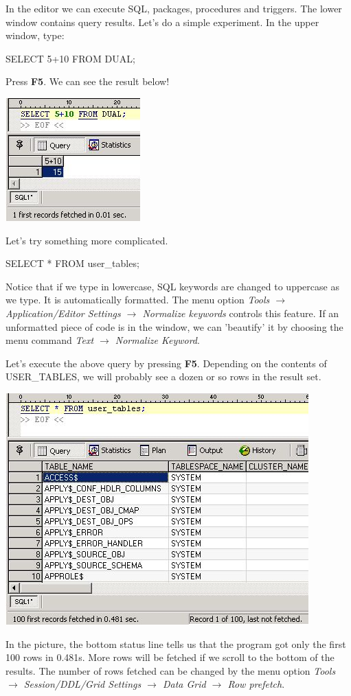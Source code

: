\documentclass[a4paper,titlepage]{article}
\begin{document}
In the editor we can execute SQL, packages, procedures and triggers.
The lower window contains query results. Let's do a simple experiment. In the upper window, type:
\begin{center}
SELECT 5+10 FROM DUAL;\\
\end{center}
Press \textbf{F5}. We can see  the result below!\\
\begin{center}
\includegraphics[bb=0 0 196 179,scale=.7]{01main01}
\end{center}

Let's try something more complicated.
\begin{center}
SELECT * FROM user\_tables;
\end{center}

Notice that if we type in lowercase, SQL keywords are changed to uppercase as we type. 
It is automatically formatted. The menu option \emph{Tools $\to$ Application/Editor Settings $\to$ 
Normalize keywords} controls this feature.  If an unformatted piece of code is in the window, 
we can 'beautify' it by choosing the 
menu command \emph{Text $\to$ Normalize Keyword}.

Let's execute the above query by pressing \textbf{F5}. Depending on the contents of USER\_TABLES, we will probably see a 
dozen or so rows in the result set.\\
\begin{center}
\includegraphics[bb=0 0 441 337,scale=.7]{01main02}
\end{center}
In the picture, the bottom status line tells us that the program got only the first 100 rows in 0.481s.  More rows will
be fetched if we scroll to the bottom of the results.
The number of rows fetched can be changed by the menu option
\emph{Tools $\to$ Session/DDL/Grid Settings $\to$ Data Grid $\to$ Row prefetch}.
\end{document}
